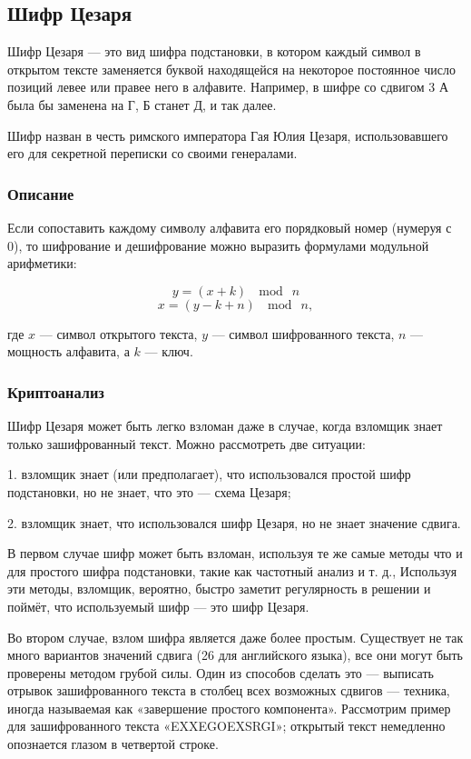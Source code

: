 \subsection{Шифр Цезаря}

Шифр Цезаря — это вид шифра подстановки, в котором каждый символ в открытом тексте заменяется буквой находящейся на некоторое постоянное число позиций левее или правее него в алфавите. Например, в шифре со сдвигом 3 А была бы заменена на Г, Б станет Д, и так далее.

Шифр назван в честь римского императора Гая Юлия Цезаря, использовавшего его для секретной переписки со своими генералами.

\subsubsection{Описание}

Если сопоставить каждому символу алфавита его порядковый номер (нумеруя с 0), то шифрование и дешифрование можно выразить формулами модульной арифметики:

    $$y=(x+k)\ \mod\ n$$
    $$x=(y-k+n)\ \mod\ n,$$

где $x$ — символ открытого текста, $y$ — символ шифрованного текста, $n$ — мощность алфавита, а $k$ — ключ.

\subsubsection{Криптоанализ}

Шифр Цезаря может быть легко взломан даже в случае, когда взломщик знает только зашифрованный текст. Можно рассмотреть две ситуации:

1. взломщик знает (или предполагает), что использовался простой шифр подстановки, но не знает, что это — схема Цезаря;

2. взломщик знает, что использовался шифр Цезаря, но не знает значение сдвига.

В первом случае шифр может быть взломан, используя те же самые методы что и для простого шифра подстановки, такие как частотный анализ и т. д., Используя эти методы, взломщик, вероятно, быстро заметит регулярность в решении и поймёт, что используемый шифр — это шифр Цезаря.

Во втором случае, взлом шифра является даже более простым. Существует не так много вариантов значений сдвига (26 для английского языка), все они могут быть проверены методом грубой силы. Один из способов сделать это — выписать отрывок зашифрованного текста в столбец всех возможных сдвигов — техника, иногда называемая как «завершение простого компонента». Рассмотрим пример для зашифрованного текста «EXXEGOEXSRGI»; открытый текст немедленно опознается глазом в четвертой строке.

